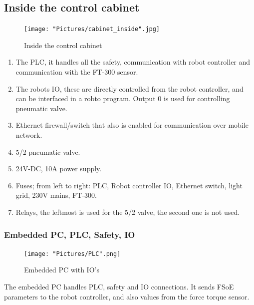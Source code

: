 \documentclass{article}
\begin{document}
        \newpage
        
        \subsection{Inside the control cabinet }
        \begin{figure}[!h]
            \centering
            \texttt{[image: "Pictures/cabinet\_inside".jpg]}
            \caption{Inside the control cabinet}
        \end{figure}
        
        \begin{enumerate}
        
            \item The PLC, it handles all the safety, communication with robot controller and communication with the FT-300 sensor. 
            \item The robots IO, these are directly controlled from the robot controller, and can be interfaced in a robto program. Output 0 is used for controlling pneumatic valve.
            \item Ethernet firewall/switch that also is enabled for communication over mobile network.
            \item 5/2 pneumatic valve.
            \item 24V-DC, 10A power supply.
            \item Fuses; from left to right: PLC, Robot controller IO, Ethernet switch, light grid, 230V mains, FT-300. 
            \item Relays, the leftmost is used for the 5/2 valve, the second one is not used.
        \end{enumerate}
        
        \newpage
        
        \subsubsection{Embedded PC, PLC, Safety, IO}
        
        \begin{figure}[!h]
            \centering
            \texttt{[image: "Pictures/PLC".png]}
            \caption{Embedded PC with IO's}
        \end{figure}
        
        The embedded PC handles PLC, safety and IO connections. It sends FSoE parameters to the robot controller, and also values from the force torque sensor.  
    
\end{document}
